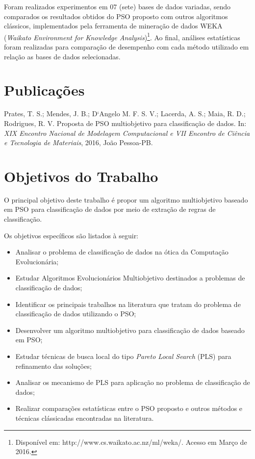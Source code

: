 \documentclass[
	12pt,				%
	openany,			%
	oneside,	
	a4paper,			%
	brazil,				%
	]{unimontes-ppgmsc-abntex2}
\begin{document}
Foram realizados experimentos em 07 (sete) bases de dados variadas, sendo comparados os resultados obtidos do PSO proposto com outros algoritmos clássicos, implementados pela ferramenta de mineração de dados WEKA (\textit{Waikato Environment for Knowledge Analysis})\footnote{Disponível em: http://www.cs.waikato.ac.nz/ml/weka/. Acesso em Março de 2016.}. Ao final, análises estatísticas foram realizadas para comparação de desempenho com cada método utilizado em relação as bases de dados selecionadas.

\section{Publicações}

Prates, T. S.; Mendes, J. B.; D‘Angelo M. F. S. V.; Lacerda, A. S.; Maia, R. D.; Rodrigues, R. V. Proposta de PSO multiobjetivo para classificação de dados. In: {\em XIX Encontro Nacional de Modelagem Computacional e VII Encontro de Ciência e Tecnologia de Materiais}, 2016, João Pessoa-PB.

\section{Objetivos do Trabalho}

O principal objetivo deste trabalho é propor um algoritmo multiobjetivo baseado em PSO para classificação de dados por meio de extração de regras de classificação. 

Os objetivos específicos são listados à seguir: 

\begin{itemize}
	\item Analisar o problema de classificação de dados na ótica da Computação Evolucionária;
	\item Estudar Algoritmos Evolucionários Multiobjetivo destinados a problemas de classificação de dados;
	\item Identificar os principais trabalhos na literatura que tratam do problema de classificação de dados utilizando o PSO;
	\item Desenvolver um algoritmo multiobjetivo para classificação de dados baseado em PSO;
	\item Estudar técnicas de busca local do tipo {\em Pareto Local Search} (PLS) para refinamento das soluções;
	\item Analisar os mecanismo de PLS para aplicação no problema de classificação de dados;
	\item Realizar comparações estatísticas entre o PSO proposto e outros métodos e técnicas clássicadas encontradas na literatura.
\end{itemize}
\end{document}
